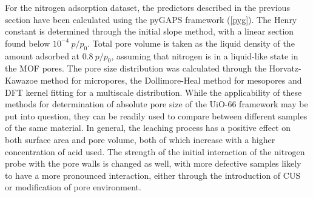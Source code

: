 For the nitrogen adsorption dataset, the predictors described in the 
previous section have been calculated using the pyGAPS framework
(\autoref{pyg}). The Henry constant is determined through the 
initial slope method, with a linear section found below 
\(10^{-4}~p/p_0\). Total pore volume is taken as the liquid density
of the amount adsorbed at \(0.8~p/p_0\), assuming that 
nitrogen is in a liquid-like state in the MOF pores. The pore
size distribution was calculated through the Horvatz-Kawazoe
method for micropores, the Dollimore-Heal method for mesopores
and DFT kernel fitting for a multiscale distribution. While 
the applicability of these methods for determination of absolute
pore size of the UiO-66 framework may be put into question, 
they can be readily used to compare between different samples
of the same material.
In general, the leaching process has a positive effect on 
both surface area and pore volume, both of which increase 
with a higher concentration of acid used. The strength of 
the initial interaction of the nitrogen probe with the pore 
walls is changed as well, with more defective samples likely
to have a more pronounced interaction, either through the introduction
of CUS or modification of pore environment.

